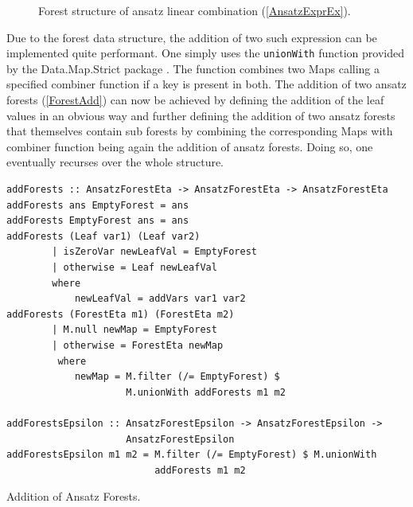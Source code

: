 \documentclass[a4paper,12pt, DIV=14, BCOR=5mm, twoside, headsepline, numbers=noenddot]{scrbook}
\begin{document}
\begin{figure}
\caption{Forest structure of ansatz linear combination (\ref{AnsatzExprEx}). }
\label{AnsatzExprExForest}
\end{figure}

Due to the forest data structure, the addition of two such expression can be implemented quite performant. One simply uses the \texttt{unionWith} function provided by the Data.Map.Strict package \cite{HackageMap}. The function combines two Maps calling a specified combiner function if a key is present in both. The addition of two ansatz forests (\ref{ForestAdd}) can now be achieved by defining the addition of the leaf values in an obvious way and further defining the addition of two ansatz forests that themselves contain sub forests by combining the corresponding Maps with combiner function being again the addition of ansatz forests. Doing so, one eventually recurses over the whole structure. 
\begin{listing}[hbt!] 
\begin{verbatim}
addForests :: AnsatzForestEta -> AnsatzForestEta -> AnsatzForestEta
addForests ans EmptyForest = ans
addForests EmptyForest ans = ans
addForests (Leaf var1) (Leaf var2)
        | isZeroVar newLeafVal = EmptyForest
        | otherwise = Leaf newLeafVal
        where
            newLeafVal = addVars var1 var2
addForests (ForestEta m1) (ForestEta m2)
        | M.null newMap = EmptyForest
        | otherwise = ForestEta newMap
         where
            newMap = M.filter (/= EmptyForest) $
                     M.unionWith addForests m1 m2

addForestsEpsilon :: AnsatzForestEpsilon -> AnsatzForestEpsilon ->
                     AnsatzForestEpsilon
addForestsEpsilon m1 m2 = M.filter (/= EmptyForest) $ M.unionWith
                          addForests m1 m2
\end{verbatim} 
\caption{Addition of Ansatz Forests.}\label{ForestAdd}
\end{listing}\\
\end{document}
